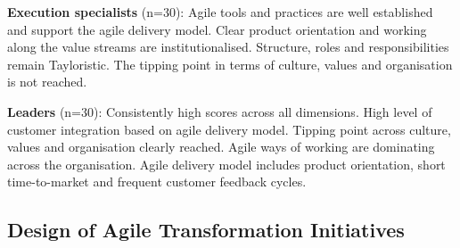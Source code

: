 \documentclass{article}
\newcommand{\myremark}[1]{{#1}}
\newcommand{\ikremark}[1]{\myremark{\color{blue} [Ivan: #1]}}
\begin{document}
\textbf{Execution specialists} (n=30): Agile tools and practices are well established and support the agile delivery model. Clear product orientation and working along the value streams are institutionalised. Structure, roles and responsibilities remain Tayloristic. The tipping point in terms of culture, values and organisation is not reached.

\textbf{Leaders} (n=30): Consistently high scores across all dimensions. High level of customer integration based on agile delivery model. Tipping point across culture, values and organisation clearly reached. Agile ways of working are dominating across the organisation. Agile delivery model includes product orientation, short time-to-market and frequent customer feedback cycles.










\subsection{Design of Agile Transformation Initiatives}
\end{document}
